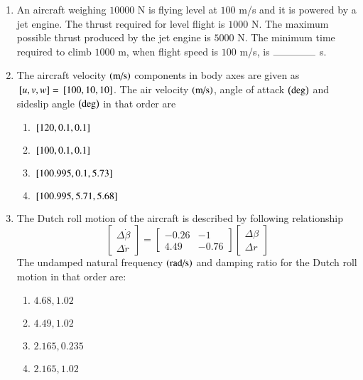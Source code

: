 \documentclass[journal,12pt,onecolumn]{IEEEtran}
\theoremstyle{remark}
\begin{document}
\begin{enumerate}[start=40]
	\item An aircraft weighing $10000$ N is flying level at $100$ m/s and it is powered by a jet engine. The thrust required for level flight is $1000$ N. The maximum possible thrust produced by the jet engine is $5000$ N. The minimum time required to climb $1000$ m, when flight speed is $100$ m/s, is $\rule{1.5cm}{0.4pt}$ s.\\

	\item The aircraft velocity $\left(\text{m/s}\right)$ components in body axes are given as ${}\left[u, v, w\right] = {}\left[100, 10, 10\right]$. The air velocity $\left(\text{m/s}\right)$, angle of attack $\left(\text{deg}\right)$ and sideslip angle $\left(\text{deg}\right)$ in that order are
		\begin{enumerate}
			\item ${}\left[120,0.1,0.1\right]$
			\item ${}\left[100,0.1,0.1\right]$
			\item ${}\left[100.995,0.1,5.73\right]$
			\item ${}\left[100.995,5.71,5.68\right]$\\
		\end{enumerate}
		
	\item The Dutch roll motion of the aircraft is described by following relationship
$$\begin{bmatrix}
\Delta \dot{\beta} \\ 
\Delta \dot{r} 
\end{bmatrix} 
= 
\begin{bmatrix} 
-0.26 & -1 \\ 
4.49 & -0.76 
\end{bmatrix}
\begin{bmatrix} 
\Delta \beta \\ 
\Delta r 
\end{bmatrix}$$
The undamped natural frequency $\left(\text{rad/s}\right)$ and damping ratio for the Dutch roll motion in that order are:
               \begin{enumerate}
		       \item $4.68,1.02$
		       \item $4.49,1.02$
		       \item $2.165,0.235$
		       \item $2.165,1.02$
	       \end{enumerate}
\end{enumerate}
\end{document}
